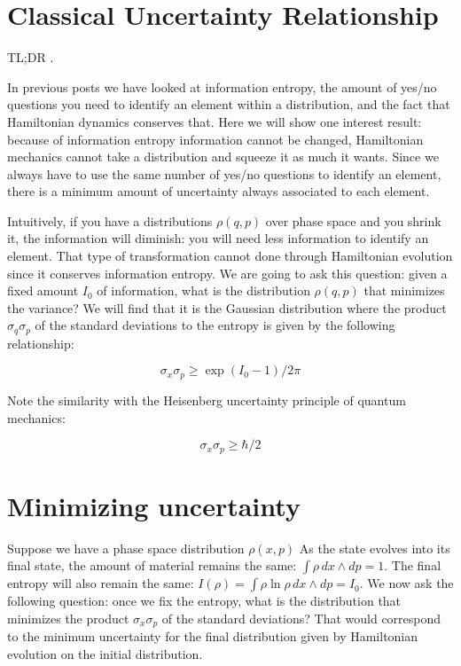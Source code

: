 \documentclass[aps,pra,10pt,floatfix,nofootinbib]{revtex4-1}
\theoremstyle{definition}
\begin{document}
	
\section{Classical Uncertainty Relationship}

TL;DR .

In previous posts we have looked at information entropy, the amount of yes/no questions you need to identify an element within a distribution, and the fact that Hamiltonian dynamics conserves that. Here we will show one interest result: because of information entropy information cannot be changed, Hamiltonian mechanics cannot take a distribution and squeeze it as much it wants. Since we always have to use the same number of yes/no questions to identify an element, there is a minimum amount of uncertainty always associated to each element.

Intuitively, if you have a distributions $\rho(q,p)$ over phase space and you shrink it, the information will diminish: you will need less information to identify an element. That type of transformation cannot done through Hamiltonian evolution since it conserves information entropy. We are going to ask this question: given a fixed amount $I_0$ of information, what is the distribution $\rho(q,p)$ that minimizes the variance? We will find that it is the Gaussian distribution where the product $\sigma_q\sigma_p$ of the standard deviations to the entropy is given by the following relationship:

\begin{equation}
\sigma_x\sigma_p \geq \exp (I_0 - 1) / 2 \pi 
\label{classicalUncertainty}
\end{equation}

Note the similarity with the Heisenberg uncertainty principle of quantum mechanics:

\begin{equation}
\sigma_x\sigma_p \geq \hbar / 2
\label{quantumUncertainty}
\end{equation}

\section{Minimizing uncertainty}

Suppose we have a phase space distribution $\rho(x,p)$ As the state evolves into its final state, the amount of material remains the same: $\int \rho \, dx \wedge dp = 1$. The final entropy will also remain the same: $I(\rho) = \int \rho \ln \rho \, dx \wedge dp = I_0$. We now ask the following question: once we fix the entropy, what is the distribution that minimizes the product $\sigma_x\sigma_p$ of the standard deviations? That would correspond to the minimum uncertainty for the final distribution given by Hamiltonian evolution on the initial distribution.
\end{document}
